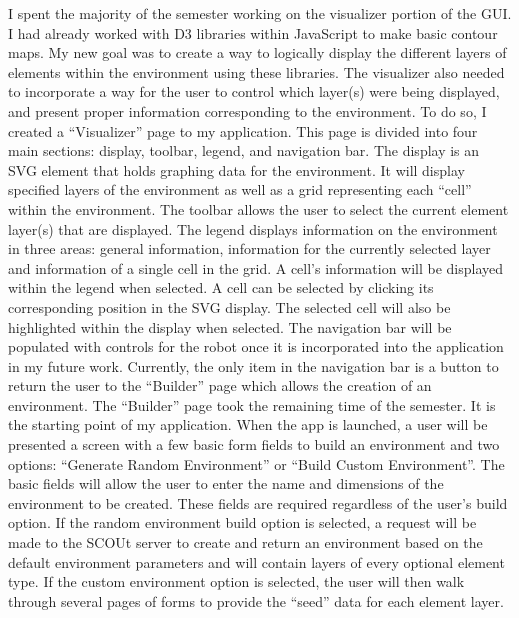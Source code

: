 I spent the majority of the semester working on the visualizer portion of the GUI.
I had already worked with D3 libraries within JavaScript to make basic contour maps.
My new goal was to create a way to logically display the different layers of elements within the environment using these libraries.
The visualizer also needed to incorporate a way for the user to control which layer(s) were being displayed, and present proper information corresponding to the environment.
To do so, I created a “Visualizer” page to my application. This page is divided into four main sections: display, toolbar, legend, and navigation bar.
The display is an SVG element that holds graphing data for the environment.
It will display specified layers of the environment as well as a grid representing each “cell” within the environment.
The toolbar allows the user to select the current element layer(s) that are displayed.
The legend displays information on the environment in three areas: general information, information for the currently selected layer and information of a single cell in the grid.
A cell’s information will be displayed within the legend when selected.
A cell can be selected by clicking its corresponding position in the SVG display.
The selected cell will also be highlighted within the display when selected.
The navigation bar will be populated with controls for the robot once it is incorporated into the application in my future work.
Currently, the only item in the navigation bar is a button to return the user to the “Builder” page which allows the creation of an environment.
The “Builder” page took the remaining time of the semester.
It is the starting point of my application.
When the app is launched, a user will be presented a screen with a few basic form fields to build an environment and two options: “Generate Random Environment” or “Build Custom Environment”.
The basic fields will allow the user to enter the name and dimensions of the environment to be created.
These fields are required regardless of the user’s build option.
If the random environment build option is selected, a request will be made to the SCOUt server to create and return an environment based on the default environment parameters and will contain layers of every optional element type.
If the custom environment option is selected, the user will then walk through several pages of forms to provide the “seed” data for each element layer.
